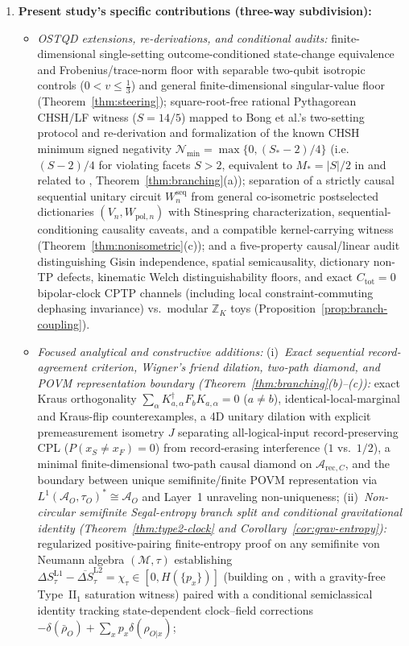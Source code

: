 \documentclass[11pt,a4paper]{article}
\theoremstyle{definition}
\theoremstyle{remark}
\newcommand{\cA}{\mathcal{A}}
\newcommand{\cM}{\mathcal{M}}
\newcommand{\cN}{\mathcal{N}}
\newcommand{\bbZ}{\mathbb{Z}}
\newcommand{\1}{\mathbf{1}}
\begin{document}
\begin{enumerate}
  \item \textbf{Present study's specific contributions (three-way subdivision):}
  \begin{itemize}
    \item[\textbf{(A)}] \emph{OSTQD extensions, re-derivations, and conditional audits:} finite-dimensional single-setting outcome-conditioned state-change equivalence and Frobenius/trace-norm floor with separable two-qubit isotropic controls ($0<v\le\frac{1}{3}$) and general finite-dimensional singular-value floor (Theorem~\ref{thm:steering}); square-root-free rational Pythagorean CHSH/LF witness ($S=14/5$) mapped to Bong et al.'s two-setting protocol and re-derivation and formalization of the known CHSH minimum signed negativity $\cN_{\min}=\max\{0,(S_*-2)/4\}$ (i.e.\ $(S-2)/4$ for violating facets $S>2$, equivalent to $M_*=|S|/2$ in \cite{Oas2014} and related to \cite{Morris2022}, Theorem~\ref{thm:branching}(a)); separation of a strictly causal sequential unitary circuit $W_n^{\mathrm{seq}}$ from general co-isometric postselected dictionaries $(V_n,W_{\mathrm{pol},n})$ with Stinespring characterization, sequential-conditioning causality caveats, and a compatible kernel-carrying witness (Theorem~\ref{thm:nonisometric}(c)); and a five-property causal/linear audit distinguishing Gisin independence, spatial semicausality, dictionary non-TP defects, kinematic Welch distinguishability floors, and exact $C_{\mathrm{tot}}=0$ bipolar-clock CPTP channels (including local constraint-commuting dephasing invariance) vs.\ modular $\bbZ_K$ toys (Proposition~\ref{prop:branch-coupling}).
    \item[\textbf{(B)}] \emph{Focused analytical and constructive additions:}
    (i)~\emph{Exact sequential record-agreement criterion, Wigner's friend dilation, two-path diamond, and POVM representation boundary (Theorem~\ref{thm:branching}(b)--(c)):} exact Kraus orthogonality $\sum_\alpha K_{a,\alpha}^\dagger F_b K_{a,\alpha}=0$ ($a\neq b$), identical-local-marginal and Kraus-flip counterexamples, a 4D unitary dilation with explicit premeasurement isometry $J$ separating all-logical-input record-preserving CPL ($P(x_S\neq x_F)=0$) from record-erasing interference ($1$ vs.\ $1/2$), a minimal finite-dimensional two-path causal diamond on $\cA_{\mathrm{rec},C}$, and the boundary between unique semifinite/finite POVM representation via $L^1(\cA_O,\tau_O)^*\cong\cA_O$ and Layer~1 unraveling non-uniqueness;
    (ii)~\emph{Non-circular semifinite Segal-entropy branch split and conditional gravitational identity (Theorem~\ref{thm:type2-clock} and Corollary~\ref{cor:grav-entropy}):} regularized positive-pairing finite-entropy proof on any semifinite von Neumann algebra $(\cM,\tau)$ establishing $\Delta S_\tau^{\mathrm{L1}}-\overline{\Delta S}_\tau^{\mathrm{L2}}=\chi_\tau\in[0,H(\{p_x\})]$ (building on \cite{Segal1960,Araki1976,Araki1977,HaradaKosaki2010,PodsedkowskaWieczorek2017,LongoWitten2023}, with a gravity-free Type~$\mathrm{II}_1$ saturation witness) paired with a conditional semiclassical identity tracking state-dependent clock--field corrections $-\delta(\bar{\rho}_O)+\sum_x p_x\delta(\rho_{O|x})$;

\end{itemize}
\end{enumerate}
\end{document}
